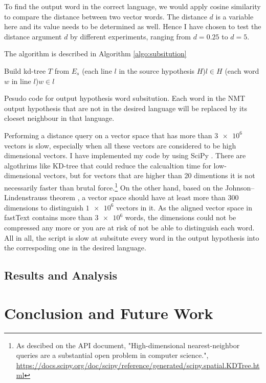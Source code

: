 \documentclass[thesis,fonts=libertine]{cluu}
\begin{document}
To find the output word in the correct language, we would apply cosine similarity to compare the distance between two vector words. The distance $d$ is a variable here and its value needs to be determined as well. Hence I have chosen to test the distance argument $d$ by different experiments, ranging from $d=0.25$ to $d=5$.

The algorithm is described in Algorithm \ref{algo:subsitution}

\begin{algorithm}[H]
  \label{algo:subsitution}
  \SetAlgoLined

  Build kd-tree $T$ from $E_s$
  \For(each line $l$ in the source hypothesis $H$){$l \in H$}{
    \For(each word $w$ in line $l$){$w \in l$}{
    }
  }
  \caption{Pesudo code for output hypothesis word subsitution. Each word in the NMT output hypothesis that are not in the desired language will be replaced by its cloeset neighbour in that language.}
\end{algorithm}

Performing a distance query on a vector space that has more than $\num{3e6}$ vectors is slow, especially when all these vectors are considered to be high dimensional vectors.  I have implemented my code by using SciPy \parencite{Virtanen:2019aa}. There are algothrims like KD-tree \parencite{Maneewongvatana:aa} that could reduce the calcualtion time for low-dimensional vectors, but for vectors that are higher than 20 dimentions it is not necessarily faster than brutal force.\footnote{As descibed on the API document, "High-dimensional nearest-neighbor queries are a substantial open problem in computer science.", \url{https://docs.scipy.org/doc/scipy/reference/generated/scipy.spatial.KDTree.html}} On the other hand, based on the Johnson–Lindenstrauss theorem \parencite{johnson1984extensions}, a vector space should have at least more than 300 dimensions to distinguish $\num{1e6}$ vectors in it. As the aligned vector space in fastText contains more than $\num{3e6}$ words, the dimensions could not be compressed any more or you are at risk of not be able to distinguish each word. All in all, the script is slow at subsitute every word in the output hypothesis into the correspoding one in the desired language.

\section{Results and Analysis}

\chapter{Conclusion and Future Work}
\label{chap:conclusion}

\printbibliography
\end{document}
